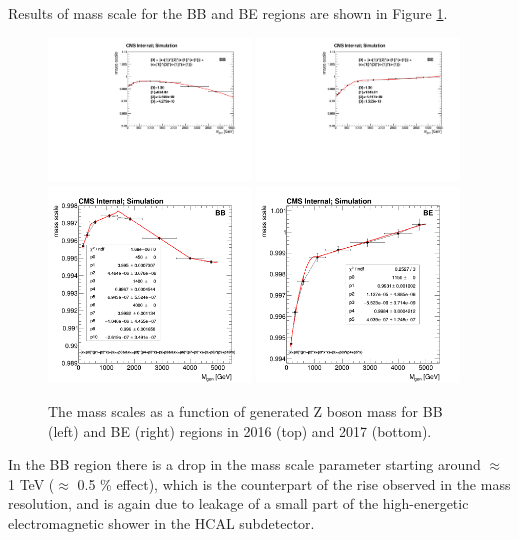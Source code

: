 Results of mass scale for the BB and BE regions are shown in Figure \ref{fig:scale}.

\begin{figure}[ht]
\centering
\includegraphics[width=0.48\textwidth]{figures/Zprime/2016/mass_resolution/scale_BB.pdf}
\includegraphics[width=0.48\textwidth]{figures/Zprime/2016/mass_resolution/scale_BE.pdf}
\includegraphics[width=0.48\textwidth]{figures/Zprime/2017/mass_resolution/High_Mass/BB_mean}
\includegraphics[width=0.48\textwidth]{figures/Zprime/2017/mass_resolution/High_Mass/BE_mean}
\caption{The mass scales as a function of generated Z boson mass for BB (left) and BE (right) regions in 2016 (top) \cite{CMS-AN-2016-404} and 2017 (bottom).
 \label{fig:scale}}
\end{figure}

In the BB region there is a drop in the mass scale parameter starting around $\approx$ 1 TeV ($\approx$ 0.5 \% effect), which is the counterpart of the rise observed in the mass resolution, and is again due to leakage of a small part of the high-energetic electromagnetic shower in the HCAL subdetector.
